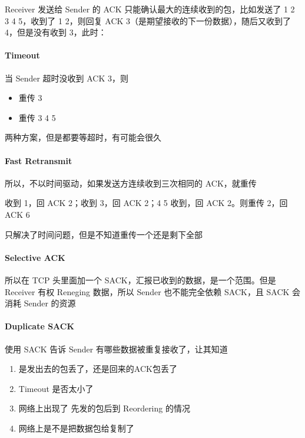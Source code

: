 \documentclass[11pt,journal,compsoc]{IEEEtran}
\begin{document}
Receiver 发送给 Sender 的 ACK 只能确认最大的连续收到的包，比如发送了 1 2 3 4 5，收到了 1 2，则回复 ACK 3（是期望接收的下一份数据），随后又收到了 4，但是没有收到 3，此时：

\paragraph{Timeout}

当 Sender 超时没收到 ACK 3，则

\begin{itemize}
    \item 重传 3
    \item 重传 3 4 5
\end{itemize}

两种方案，但是都要等超时，有可能会很久

\paragraph{Fast Retransmit}

所以，不以时间驱动，如果发送方连续收到三次相同的 ACK，就重传

收到 1，回 ACK 2；收到 3，回 ACK 2；4 5 收到，回 ACK 2。则重传 2，回 ACK 6

只解决了时间问题，但是不知道重传一个还是剩下全部

\paragraph{Selective ACK}

所以在 TCP 头里面加一个 SACK，汇报已收到的数据，是一个范围。但是 Receiver 有权 Reneging 数据，所以 Sender 也不能完全依赖 SACK，且 SACK 会消耗 Sender 的资源

\paragraph{Duplicate SACK}

使用 SACK 告诉 Sender 有哪些数据被重复接收了，让其知道

\begin{enumerate}
    \item 是发出去的包丢了，还是回来的ACK包丢了

    \item Timeout 是否太小了

    \item 网络上出现了 先发的包后到 Reordering 的情况

    \item 网络上是不是把数据包给复制了
\end{enumerate}
\end{document}
